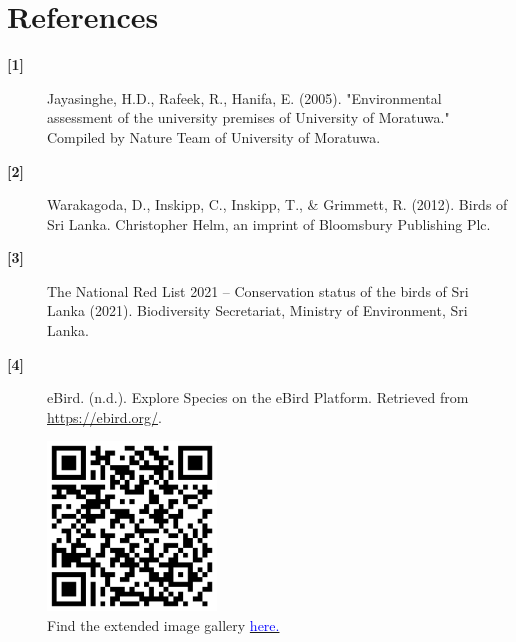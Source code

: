 \chapter{References}
\label{cp:References}

\begin{description}
    \item[\textbf{[1]}] Jayasinghe, H.D., Rafeek, R., Hanifa, E. (2005). "Environmental assessment of the university premises of University of Moratuwa." Compiled by Nature Team of University of Moratuwa.
    \\
    \item[\textbf{[2]}] Warakagoda, D., Inskipp, C., Inskipp, T., \& Grimmett, R. (2012). Birds of Sri Lanka. Christopher Helm, an imprint of Bloomsbury Publishing Plc.
    \\
    \item[\textbf{[3]}] The National Red List 2021 – Conservation status of the birds of Sri Lanka (2021). Biodiversity Secretariat, Ministry of Environment, Sri Lanka.
    \\
    \item[\textbf{[4]}] eBird. (n.d.). Explore Species on the eBird Platform. Retrieved from \url{https://ebird.org/}.
\end{description}

\begin{figure}[!htpb]
    \centering
    \includegraphics[width=0.4\textwidth]{Figures/QR.png}
    \caption[]{Find the extended image gallery \href{https://chathura-de-silva.github.io/Mora-Bird-Diversity/}{\textcolor{blue}{here.}}}
    \label{fig:figure-01}
\end{figure}